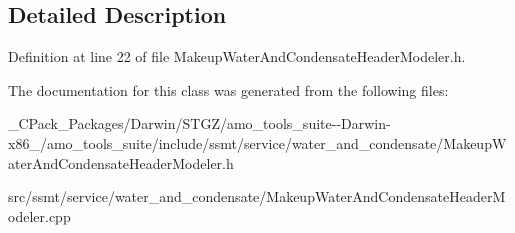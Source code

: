 \begin{DoxyCompactItemize}
\end{DoxyCompactItemize}


\subsection{Detailed Description}


Definition at line 22 of file Makeup\+Water\+And\+Condensate\+Header\+Modeler.\+h.



The documentation for this class was generated from the following files\+:\begin{DoxyCompactItemize}
\item 
\+\_\+\+C\+Pack\+\_\+\+Packages/\+Darwin/\+S\+T\+G\+Z/amo\+\_\+tools\+\_\+suite-\/-\/\+Darwin-\/x86\+\_/amo\+\_\+tools\+\_\+suite/include/ssmt/service/water\+\_\+and\+\_\+condensate/Makeup\+Water\+And\+Condensate\+Header\+Modeler.\+h\item 
src/ssmt/service/water\+\_\+and\+\_\+condensate/Makeup\+Water\+And\+Condensate\+Header\+Modeler.\+cpp\end{DoxyCompactItemize}
